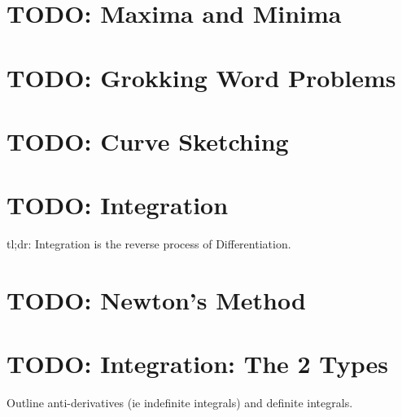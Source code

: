 \section{TODO: Maxima and Minima}
\label{sec:MaximaAndMinima}
\lipsum[1]
\newpage
\section{TODO: Grokking Word Problems}
\label{sec:GrokkingWordProblems}
\lipsum[1]
\newpage
\section{TODO: Curve Sketching}
\label{sec:CurveSketching}
\lipsum[1]
\newpage
\section{TODO: Integration}
\label{sec:Integration}
tl;dr: Integration is the reverse process of Differentiation.
\newpage
\section{TODO: Newton's Method}
\label{sec:NewtonsMethod}
\lipsum[1]
\newpage
\section{TODO: Integration: The 2 Types}
\label{sec:IntegrationThe2Types}
Outline anti-derivatives (ie indefinite integrals) and definite integrals.
\newpage
